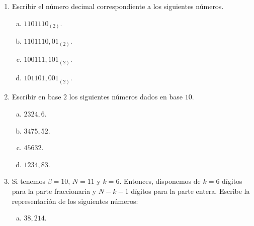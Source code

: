 \documentclass[
	spanish,
	9pt,
	utf8,
	xcolor=table,
	handout,
	aspectratio=1610,
	professionalfonts,
	notheorems,
	mathserif,
]{beamer}
\begin{document}
\begin{frame}

	\begin{enumerate}
		\item
		      Escribir el número decimal correspondiente a los siguientes números.

		      \begin{multicols}{4}
			      \begin{enumerate}[a)]
				      \item
				            ${1101110}_{\left(2\right)}$.

				      \item
				            $1101110,01_{\left(2\right)}$.

				      \item
				            ${100111,101}_{\left(2\right)}$.

				      \item
				            ${101101,001}_{\left(2\right)}$.
			      \end{enumerate}
		      \end{multicols}

		\item
		      Escribir en base $2$ los siguientes números dados en base $10$.

		      \begin{multicols}{4}
			      \begin{enumerate}[a)]
				      \item
				            $2324,6$.

				      \item
				            $3475,52$.

				      \item
				            $45632$.

				      \item
				            $1234,83$.
			      \end{enumerate}
		      \end{multicols}

		\item
		      Si tenemos $\beta=10$, $N=11$ y $k=6$.
		      Entonces, disponemos de $k=6$ dígitos para la parte fraccionaria y $N-k-1$ dígitos para la parte entera.
		      Escribe la representación de los siguientes números:

		      \begin{multicols}{4}
			      \begin{enumerate}[a)]
				      \item
				            $38,214$.


\end{enumerate}
\end{multicols}
\end{enumerate}
\end{frame}
\end{document}
